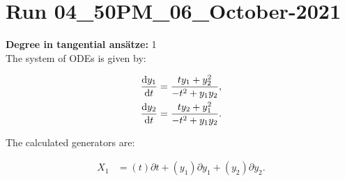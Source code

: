 \section*{Run 04\_50PM\_06\_October-2021}
\textbf{Degree in tangential ansätze:}	1\\
The system of ODEs is given by:

\begin{align*}
\dv{y_{1}}{t}&=\frac{t y_{1} + y_{2}^{2}}{- t^{2} + y_{1} y_{2}},\\
\dv{y_{2}}{t}&=\frac{t y_{2} + y_{1}^{2}}{- t^{2} + y_{1} y_{2}}.\\
\end{align*}

\noindent The calculated generators are:

\begin{align*}
X_{1}&=\left( t \right)\partial t+\left( y_{1} \right)\partial y_{1}+\left( y_{2} \right)\partial y_{2}.\\
\end{align*}
